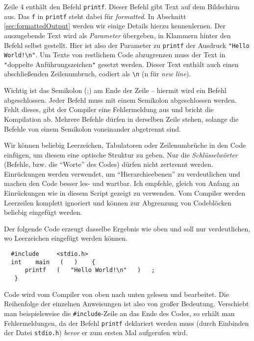 Zeile 4 enthält den Befehl \texttt{printf}. Dieser Befehl gibt Text auf dem Bildschirm aus. Das \texttt{f} in \texttt{printf} steht dabei für \emph{formatted}. In Abschnitt \ref{sec:formattedOutput} werden wir einige Details hierzu kennenlernen. Der auszugebende Text wird als \emph{Parameter} übergeben, \ie in Klammern hinter den Befehl selbst gestellt. Hier ist also der Parameter zu \texttt{printf} der Ausdruck \texttt{"Hello World!\textbackslash n"}. Um Texte von restlichem Code abzugrenzen muss der Text in \texttt{"}doppelte Anführungszeichen\texttt{"} gesetzt werden. Dieser Text enthält auch einen abschließenden Zeilenumbruch, codiert als \texttt{\textbackslash n} (n für \emph{new line}).

Wichtig ist das Semikolon (;) am Ende der Zeile -- hiermit wird ein Befehl abgeschlossen. Jeder Befehl muss mit einem Semikolon abgeschlossen werden. Fehlt dieses, gibt der Compiler eine Fehlermeldung aus und bricht die Kompilation ab. Mehrere Befehle dürfen in derselben Zeile stehen, solange die Befehle von einem Semikolon voneinander abgetrennt sind.

Wir können beliebig Leerzeichen, Tabulatoren oder Zeilenumbrüche in den Code einfügen, um diesem eine optische Struktur zu geben. Nur die \emph{Schlüsselwörter} (\eg Befehle, bzw. die \enquote{Worte} des Codes) dürfen nicht zertrennt werden. Einrückungen werden verwendet, um \enquote{Hierarchieebenen} zu verdeutlichen und machen den Code besser les- und wartbar. Ich empfehle, gleich von Anfang an Einrückungen wie in diesem Script gezeigt zu verwenden. Vom Compiler werden Leerzeilen komplett ignoriert und können zur Abgrenzung von Codeblöcken beliebig eingefügt werden.

Der folgende Code erzeugt dasselbe Ergebnis wie oben und soll nur verdeutlichen, wo Leerzeichen eingefügt werden können.
\begin{codebox}
\begin{verbatim}
  #include     <stdio.h>
  int    main   (   )    {
      printf   (   "Hello World!\n"   )   ;
   }
\end{verbatim}
\end{codebox}

Code wird vom Compiler von oben nach unten gelesen und bearbeitet. Die Reihenfolge der einzelnen Anweisungen ist also von großer Bedeutung. Verschiebt man beispielsweise die \texttt{#include}-Zeile an das Ende des Codes, so erhält man Fehlermeldungen, da der Befehl \texttt{printf} deklariert werden muss (durch Einbinden der Datei \texttt{stdio.h}) \emph{bevor} er zum ersten Mal aufgerufen wird.

